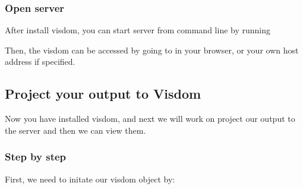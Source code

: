 \documentclass[letterpaper,10pt,english]{sphinxmanual}
\begin{document}
%
\begin{sphinxVerbatim}[commandchars=\\\{\}]
  
   
 

 
\end{sphinxVerbatim}


\subsubsection{Open server}
\label{\detokenize{usage/view:open-server}}
After install visdom, you can start server from command line by running

%
\begin{sphinxVerbatim}[commandchars=\\\{\}]
  
\end{sphinxVerbatim}

Then, the visdom can be accessed by going to  in your browser, or your own host address if specified.


\subsection{Project your output to Visdom}
\label{\detokenize{usage/view:project-your-output-to-visdom}}
Now you have installed visdom, and next we will work on project our output to the server and then we can view them.


\subsubsection{Step by step}
\label{\detokenize{usage/view:step-by-step}}
First, we need to initate our visdom object by:

%
\begin{sphinxVerbatim}[commandchars=\\\{\}]
  
\end{sphinxVerbatim}
\end{document}
